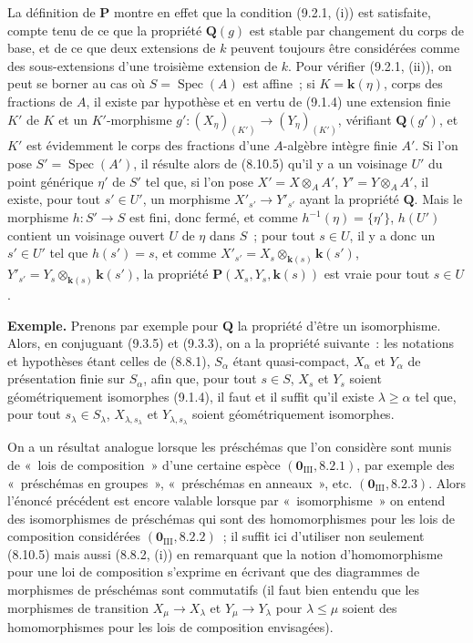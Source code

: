 La définition de $\mathbf P$ montre en effet que la condition (9.2.1, (i))
est satisfaite, compte tenu de ce que la propriété $\mathbf Q(g)$ est stable
par changement du corps de base, et de ce que deux extensions de $k$ peuvent
toujours être considérées comme des sous-extensions d'une troisième extension
de $k$. Pour vérifier (9.2.1, (ii)), on peut se borner au cas où
$S=\operatorname{Spec}(A)$ est affine~; si $K=\mathbf{k}(\eta)$, corps des fractions de
$A$, il existe par hypothèse et en vertu de (9.1.4) une extension finie $K'$ de
$K$ et un $K'$-morphisme
$g':(X_\eta)_{(K')}\to(Y_\eta)_{(K')}$, vérifiant $\mathbf Q(g')$, et $K'$ est
évidemment le corps des fractions d'une $A$-algèbre intègre finie $A'$. Si
l'on pose $S'=\operatorname{Spec}(A')$, il résulte alors de (8.10.5) qu'il y
a un voisinage $U'$ du point générique $\eta'$ de $S'$ tel que, si l'on pose
$X'=X\otimes_A A'$, $Y'=Y\otimes_A A'$, il existe, pour tout $s'\in U'$, un
morphisme $X'_{s'}\to Y'_{s'}$ ayant la propriété $\mathbf Q$. Mais le
morphisme $h:S'\to S$ est fini, donc fermé, et comme
$h^{-1}(\eta)=\{\eta'\}$, $h(U')$ contient un voisinage ouvert $U$ de $\eta$
dans $S$~; pour tout $s\in U$, il y a donc un $s'\in U'$ tel que $h(s')=s$,
et comme
$X'_{s'}=X_s\otimes_{\mathbf{k}(s)}\mathbf{k}(s')$,
$Y'_{s'}=Y_s\otimes_{\mathbf{k}(s)}\mathbf{k}(s')$, la propriété
$\mathbf P(X_s,Y_s,\mathbf{k}(s))$ est vraie pour tout $s\in U$.

\begin{env}[9.3.6]
\label{IV.9.3.6-fr}
\textbf{Exemple.} Prenons par exemple pour $\mathbf Q$ la propriété d'être un
isomorphisme. Alors, en conjuguant (9.3.5) et (9.3.3), on a la propriété
suivante~: les notations et hypothèses étant celles de (8.8.1), $S_\alpha$
étant quasi-compact, $X_\alpha$ et $Y_\alpha$ de présentation finie sur
$S_\alpha$, afin que, pour tout $s\in S$, $X_s$ et $Y_s$ soient
géométriquement isomorphes (9.1.4), il faut et il suffit qu'il existe
$\lambda\geqslant\alpha$ tel que, pour tout $s_\lambda\in S_\lambda$,
$X_{\lambda,s_\lambda}$ et $Y_{\lambda,s_\lambda}$ soient géométriquement
isomorphes.
\end{env}

On a un résultat analogue lorsque les préschémas que l'on considère sont munis
de «~lois de composition~» d'une certaine espèce
$(\mathbf 0_{\mathrm{III}},8.2.1)$, par exemple des «~préschémas en groupes~»,
«~préschémas en anneaux~», etc. $(\mathbf 0_{\mathrm{III}},8.2.3)$. Alors
l'énoncé précédent est encore valable lorsque par «~isomorphisme~» on entend
des isomorphismes de préschémas qui sont des homomorphismes pour les lois de
composition considérées $(\mathbf 0_{\mathrm{III}},8.2.2)$~; il suffit ici
d'utiliser non seulement (8.10.5) mais aussi (8.8.2, (i)) en remarquant que la
notion d'homomorphisme pour une loi de composition s'exprime en écrivant que
des diagrammes de morphismes de préschémas sont commutatifs (il faut bien
entendu que les morphismes de transition $X_\mu\to X_\lambda$ et
$Y_\mu\to Y_\lambda$ pour $\lambda\leqslant\mu$ soient des homomorphismes
pour les lois de composition envisagées).


